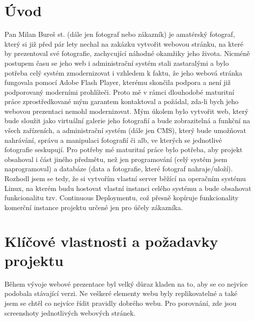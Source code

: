 \documentclass[12pt,a4paper]{report}
\begin{document}
  \chapter{Úvod}
  Pan Milan Bureš st. (dále jen fotograf nebo zákazník) je amatérský fotograf, který si již před pár lety
  nechal na zakázku vytvořit webovou stránku, na které by prezentoval své fotografie, zachycující
  náhodné okamžiky jeho života. Nicméně postupem času se jeho web i administrační systém stali
  zastaralými a bylo potřeba celý systém zmodernizovat i vzhledem k faktu, že jeho webová stránka
  fungovala pomocí Adobe Flash Player, kterému skončila podpora a není již podporovaný
  moderními prohlížeči.
  Proto mě v rámci dlouhodobé maturitní práce zprostředkované mým garantem kontaktoval a
  požádal, zda-li bych jeho webovou prezentaci nemohl modernizovat. Mým úkolem bylo vytvořit
  web, který bude sloužit jako virtuální galerie jeho fotografií a bude zobrazitelná a funkční na všech
  zařízeních, a administrační systém (dále jen CMS), který bude umožňovat nahrávání, správu a
  manipulaci fotografií či alb, ve kterých se jednotlivé fotografie seskupují.
  Pro potřeby mé maturitní práce bylo potřeba, aby projekt obsahoval i část jiného předmětu, než
  jen programování (celý systém jsem naprogramoval) a databáze (data a fotografie, které fotograf
  nahraje/uloží). Rozhodl jsem se tedy, že si vytvořím vlastní server běžící na operačním systému
  Linux, na kterém budu hostovat vlastní instanci celého systému a bude obsahovat funkcionalitu
  tzv. Continuous Deploymentu, což přesně kopíruje funkcionality komerční instance projektu určené
  jen pro účely zákazníka.

  \chapter{Klíčové vlastnosti a požadavky projektu}
  Během vývoje webové prezentace byl velký důraz kladen na to, aby se co nejvíce podobala
  stávající verzi. Ne veškeré elementy webu byly replikovatelné a také jsem se chtěl co nejvíce řídit
  pravidly dobrého webu. Pro porovnání, zde jsou screenshoty jednotlivých webových stránek.
\end{document}
